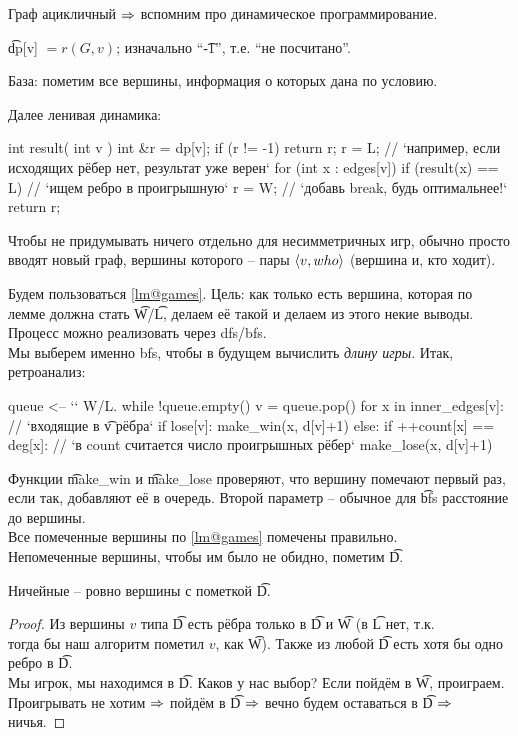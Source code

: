 \vspace*{-1.7em}

Граф ацикличный $\Rightarrow$ вспомним про динамическое программирование.

\t{dp[v]} $= r(G, v)$; изначально ``\t{-1}'', т.е. ``не посчитано''.

База: пометим все вершины, информация о которых дана по условию.

Далее ленивая динамика:
\begin{code}
int result( int v ) {
	int &r = dp[v];
	if (r != -1) return r;
	r = L; // `например, если исходящих рёбер нет, результат уже верен`
	for (int x : edges[v])
		if (result(x) == L) // `ищем ребро в проигрышную`
			r = W; // `добавь break, будь оптимальнее!`
	return r;
}
\end{code}

\begin{Rem}
Чтобы не придумывать ничего отдельно для несимметричных игр,
обычно просто вводят новый граф, вершины которого -- пары $\langle v, who \rangle$
(вершина и, кто ходит).
\end{Rem}

\pagebreak
\vspace*{-1.5em}

Будем пользоваться \autoref{lm@games}.
Цель: как только есть вершина, которая по лемме должна стать \t{W}/\t{L}, 
делаем её такой и делаем из этого некие выводы.
Процесс можно реализовать через dfs/bfs. \\
Мы выберем именно bfs, чтобы в будущем вычислить {\it длину игры}.
Итак, ретроанализ:


\begin{code}
queue <-- `\color{black}{все вершины, которые по условию}` W/L.
while !queue.empty()
	v = queue.pop()
	for x in inner_edges[v]: // `входящие в \t{v} рёбра`
		if lose[v]: 
			make_win(x, d[v]+1)
		else: 
	 		if ++count[x] == deg[x]: // `в count считается число проигрышных рёбер`
	 			make_lose(x, d[v]+1)
\end{code}
Функции \t{make\_win} и \t{make\_lose} проверяют, что 
вершину помечают первый раз, если так, добавляют её в очередь.
Второй параметр -- обычное для \t{bfs} расстояние до вершины.\\
Все помеченные вершины по \autoref{lm@games} помечены правильно. \\
Непомеченные вершины, чтобы им было не обидно, пометим \t{D}.
\begin{Thm}
Ничейные -- ровно вершины с пометкой \t{D}.
\end{Thm}
\begin{proof}
Из вершины $v$ типа \t{D} есть рёбра только в \t{D} и \t{W} (в \t{L} нет, т.к. \\
тогда бы наш алгоритм пометил $v$, как \t{W}).
Также из любой \t{D} есть хотя бы одно ребро в \t{D}.\\
Мы игрок, мы находимся в \t{D}. Каков у нас выбор? Если пойдём в \t{W}, 
проиграем. \\
Проигрывать не хотим $\Rightarrow$ пойдём в \t{D} $\Rightarrow$ вечно будем оставаться в \t{D} $\Rightarrow$ ничья.
\end{proof}

